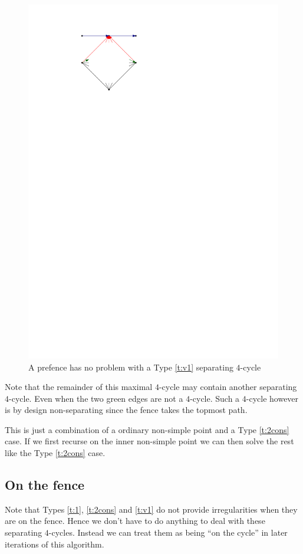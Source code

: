   \begin{figure}[h]
    \centering
    \includegraphics[scale=1]{4cycles/img/cycle_e}
    \caption{A prefence has no problem with a Type \ref{t:v1} separating $4$-cycle}
    \label{fig:4c:v1}
  \end{figure}

  Note that the remainder of this maximal $4$-cycle may contain another separating $4$-cycle. Even when the two green edges are not a $4$-cycle. Such a $4$-cycle however is by design non-separating since the fence takes the topmost path.

  This is just a combination of a ordinary non-simple point and a Type \ref{t:2cons} case. If we first recurse on the inner non-simple point we can then solve the rest like the Type \ref{t:2cons} case.

\subsection{On the fence}
  Note that Types \ref{t:1}, \ref{t:2cons} and \ref{t:v1} do not provide irregularities when they are on the fence. Hence we don't have to do anything to deal with these separating $4$-cycles. Instead we can treat them as being ``on the cycle'' in later iterations of this algorithm.

